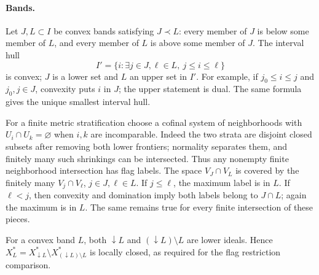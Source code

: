 \documentclass[11pt,a4paper]{article}
\theoremstyle{definition}
\begin{document}
\paragraph{Bands.} Let \(J,L\subset I\) be convex bands satisfying \(J\prec L\): every member of \(J\) is below some member of \(L\), and every member of \(L\) is above some member of \(J\). The interval hull \[
 I'=\{i:\exists j\in J,\ell\in L,\ j\le i\le\ell\}
\] is convex; \(J\) is a lower set and \(L\) an upper set in \(I'\). For example, if \(j_0\le i\le j\) and \(j_0,j\in J\), convexity puts \(i\) in \(J\); the upper statement is dual. The same formula gives the unique smallest interval hull.

For a finite metric stratification choose a cofinal system of neighborhoods with \(U_i\cap U_k=\varnothing\) when \(i,k\) are incomparable. Indeed the two strata are disjoint closed subsets after removing both lower frontiers; normality separates them, and finitely many such shrinkings can be intersected. Thus any nonempty finite neighborhood intersection has flag labels. The space \(V_J\cap V_L\) is covered by the finitely many \(V_j\cap V_\ell\), \(j\in J,\ell\in L\). If \(j\le\ell\), the maximum label is in \(L\). If \(\ell<j\), then convexity and domination imply both labels belong to \(J\cap L\); again the maximum is in \(L\). The same remains true for every finite intersection of these pieces.

For a convex band $L$, both $\downarrow L$ and
$(\downarrow L)\setminus L$ are lower ideals. Hence
$X_L^*=X_{\downarrow L}^*\setminus X_{(\downarrow L)\setminus L}^*$
is locally closed, as required for the flag restriction comparison.
\end{document}
